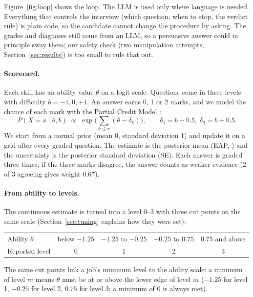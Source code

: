 \documentclass[11pt,a4paper]{article}
\begin{document}
Figure~\ref{fig:loop} shows the loop. The LLM is used only where language is needed. Everything
that controls the interview (which question, when to stop, the verdict rule) is plain code, so the
candidate cannot change the procedure by asking. The grades and diagnoses still come from an LLM,
so a persuasive answer could in principle sway them; our safety check (two manipulation attempts,
Section~\ref{sec:results}) is too small to rule that out.

\paragraph{Scorecard.} Each skill has an ability value $\theta$ on a logit scale. Questions come in
three levels with difficulty $b = -1, 0, +1$. An answer earns 0, 1 or 2 marks, and we model the
chance of each mark with the Partial Credit Model \cite{masters1982}:
\[
  P(X = x \mid \theta, b) \;\propto\; \exp\Big(\sum_{k \le x} (\theta - \delta_k)\Big),
  \qquad \delta_1 = b - 0.5,\; \delta_2 = b + 0.5 .
\]
We start from a normal prior (mean 0, standard deviation 1) and update it on a grid after every
graded question. The estimate is the posterior mean (EAP, \cite{bock1982}) and the uncertainty is
the posterior standard deviation (SE). Each answer is graded three times; if the three marks
disagree, the answer counts as weaker evidence (2 of 3 agreeing gives weight 0.67).

\paragraph{From ability to levels.} The continuous estimate is turned into a level 0--3 with three
cut points on the same scale (Section~\ref{sec:tuning} explains how they were set):

\begin{center}\small
\begin{tabular}{@{}lcccc@{}}
\toprule
Ability $\theta$ & below $-1.25$ & $-1.25$ to $-0.25$ & $-0.25$ to $0.75$ & $0.75$ and above \\
Reported level & 0 & 1 & 2 & 3 \\
\bottomrule
\end{tabular}
\end{center}

\noindent The same cut points link a job's minimum level to the ability scale: a minimum of level
$m$ means $\theta$ must be at or above the lower edge of level $m$ ($-1.25$ for level 1, $-0.25$ for
level 2, $0.75$ for level 3; a minimum of 0 is always met).
\end{document}

